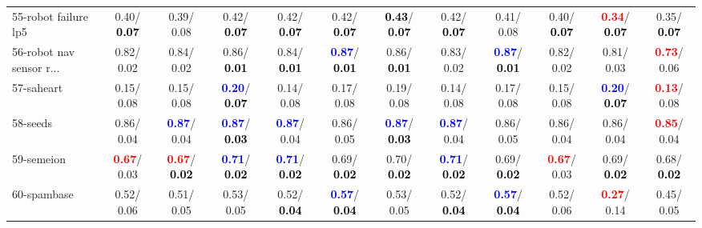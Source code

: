 \begin{table}[h]
\begin{center}
{\begin{tabular}{lc|c|c|c|c|c|c|c|c|c|c}
55-robot failure lp5 &   0.40/\textcolor{black}{\textbf{  0.07}} &   0.39/  0.08 &   0.42/\textcolor{black}{\textbf{  0.07}} &   0.42/\textcolor{black}{\textbf{  0.07}} &   0.42/\textcolor{black}{\textbf{  0.07}} & \textcolor{black}{\textbf{  0.43}}/\textcolor{black}{\textbf{  0.07}} &   0.42/\textcolor{black}{\textbf{  0.07}} &   0.41/  0.08 &   0.40/\textcolor{black}{\textbf{  0.07}} & \textcolor{red}{\textbf{  0.34}}/\textcolor{black}{\textbf{  0.07}} &   0.35/\textcolor{black}{\textbf{  0.07}} \\
56-robot nav sensor r... &   0.82/  0.02 &   0.84/  0.02 &   0.86/\textcolor{black}{\textbf{  0.01}} &   0.84/\textcolor{black}{\textbf{  0.01}} & \textcolor{blue}{\textbf{  0.87}}/\textcolor{black}{\textbf{  0.01}} &   0.86/\textcolor{black}{\textbf{  0.01}} &   0.83/  0.02 & \textcolor{blue}{\textbf{  0.87}}/\textcolor{black}{\textbf{  0.01}} &   0.82/  0.02 &   0.81/  0.03 & \textcolor{red}{\textbf{  0.73}}/  0.06 \\
57-saheart &   0.15/  0.08 &   0.15/  0.08 & \textcolor{blue}{\textbf{  0.20}}/\textcolor{black}{\textbf{  0.07}} &   0.14/  0.08 &   0.17/  0.08 &   0.19/  0.08 &   0.14/  0.08 &   0.17/  0.08 &   0.15/  0.08 & \textcolor{blue}{\textbf{  0.20}}/\textcolor{black}{\textbf{  0.07}} & \textcolor{red}{\textbf{  0.13}}/  0.08 \\
58-seeds &   0.86/  0.04 & \textcolor{blue}{\textbf{  0.87}}/  0.04 & \textcolor{blue}{\textbf{  0.87}}/\textcolor{black}{\textbf{  0.03}} & \textcolor{blue}{\textbf{  0.87}}/  0.04 &   0.86/  0.05 & \textcolor{blue}{\textbf{  0.87}}/\textcolor{black}{\textbf{  0.03}} & \textcolor{blue}{\textbf{  0.87}}/  0.04 &   0.86/  0.05 &   0.86/  0.04 &   0.86/  0.04 & \textcolor{red}{\textbf{  0.85}}/  0.04 \\
59-semeion & \textcolor{red}{\textbf{  0.67}}/  0.03 & \textcolor{red}{\textbf{  0.67}}/\textcolor{black}{\textbf{  0.02}} & \textcolor{blue}{\textbf{  0.71}}/\textcolor{black}{\textbf{  0.02}} & \textcolor{blue}{\textbf{  0.71}}/\textcolor{black}{\textbf{  0.02}} &   0.69/\textcolor{black}{\textbf{  0.02}} &   0.70/\textcolor{black}{\textbf{  0.02}} & \textcolor{blue}{\textbf{  0.71}}/\textcolor{black}{\textbf{  0.02}} &   0.69/\textcolor{black}{\textbf{  0.02}} & \textcolor{red}{\textbf{  0.67}}/  0.03 &   0.69/\textcolor{black}{\textbf{  0.02}} &   0.68/\textcolor{black}{\textbf{  0.02}} \\
60-spambase &   0.52/  0.06 &   0.51/  0.05 &   0.53/  0.05 &   0.52/\textcolor{black}{\textbf{  0.04}} & \textcolor{blue}{\textbf{  0.57}}/\textcolor{black}{\textbf{  0.04}} &   0.53/  0.05 &   0.52/\textcolor{black}{\textbf{  0.04}} & \textcolor{blue}{\textbf{  0.57}}/\textcolor{black}{\textbf{  0.04}} &   0.52/  0.06 & \textcolor{red}{\textbf{  0.27}}/  0.14 &   0.45/  0.05 \\ \hline

\end{tabular}}
\end{center}
\end{table}
